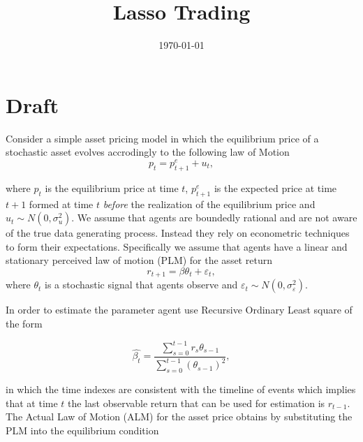 \documentclass[11pt]{article}
\title{Lasso Trading
}
\author{}
\date{\today}
\begin{document}
{
\maketitle
\centering


}


\section{Draft}

Consider a simple asset pricing model in which the equilibrium price of a stochastic asset evolves accrodingly to the following law of Motion
\begin{equation}
    p_t = p^{e}_{t+1} + u_t,
\end{equation}

where $p_t$ is the equilibrium price at time $t$, $p^{e}_{t+1}$ is the expected price at time $t+1$ formed at time $t$ \textit{before} the realization of the equilibrium price and $u_t \sim N(0, \sigma^2_u)$.
We assume that agents are boundedly rational and are not aware of the true data generating process.
Instead they rely on econometric techniques to form their expectations.
Specifically we assume that agents have a linear and stationary perceived law of motion (PLM) for the asset return 
\begin{equation}
r_{t+1} = \beta \theta_t + \varepsilon_t,
\end{equation}
where $\theta_t$ is a stochastic signal that agents observe and $\varepsilon_t \sim N(0, \sigma^2_\varepsilon)$.

In order to estimate the parameter agent use Recursive Ordinary Least square of the form 

\begin{equation}
\hat{\beta_t} = \frac{\sum^{t-1}_{s=0} r_{s} \theta_{s-1}}{\sum^{t-1}_{s=0}(\theta_{s-1})^2},
\end{equation}

in which the time indexes are consistent with the timeline of events which implies that at time $t$ the last observable return that can be used for estimation is $r_{t-1}$.
The Actual Law of Motion (ALM) for the asset price obtains by substituting the PLM into the equilibrium condition
\end{document}
